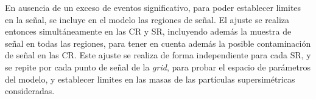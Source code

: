En ausencia de un exceso de eventos significativo, para poder establecer limites
en la señal, se incluye en el modelo las regiones de señal. El ajuste se realiza
entonces simultáneamente en las CR y SR, incluyendo además la muestra de señal
en todas las regiones, para tener en cuenta además la posible contaminación de
señal en las CR. Este ajuste se realiza de forma independiente para cada SR, y
se repite por cada punto de señal de la \emph{grid}, para probar el espacio de
parámetros del modelo, y establecer limites en las masas de las partículas
supersimétricas consideradas.
